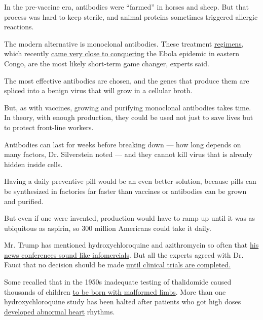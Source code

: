 In the pre-vaccine era, antibodies were ``farmed'' in horses and sheep.
But that process was hard to keep sterile, and animal proteins sometimes
triggered allergic reactions.

The modern alternative is monoclonal antibodies. These treatment
\href{https://www.nytimes.com/2019/08/12/health/ebola-outbreak-cure.html}{regimens},
which recently
\href{https://www.aljazeera.com/news/2020/04/relief-ebola-outbreak-drc-declared-200410121800377.html}{came
very close to conquering} the Ebola epidemic in eastern Congo, are the
most likely short-term game changer, experts said.

The most effective antibodies are chosen, and the genes that produce
them are spliced into a benign virus that will grow in a cellular broth.

But, as with vaccines, growing and purifying monoclonal antibodies takes
time. In theory, with enough production, they could be used not just to
save lives but to protect front-line workers.

Antibodies can last for weeks before breaking down --- how long depends
on many factors, Dr. Silverstein noted --- and they cannot kill virus
that is already hidden inside cells.

Having a daily preventive pill would be an even better solution, because
pills can be synthesized in factories far faster than vaccines or
antibodies can be grown and purified.

But even if one were invented, production would have to ramp up until it
was as ubiquitous as aspirin, so 300 million Americans could take it
daily.

Mr. Trump has mentioned hydroxychloroquine and azithromycin so often
that
\href{https://www.nytimes.com/2020/04/04/health/coronavirus-drug-trump-hydroxycholoroquine.html}{his
news conferences sound like infomercials}. But all the experts agreed
with Dr. Fauci that no decision should be made
\href{https://www.nytimes.com/2020/04/17/health/trump-hydroxychloroquine-coronavirus.html}{until
clinical trials are completed.}

Some recalled that in the 1950s inadequate testing of thalidomide caused
thousands of children
\href{http://broughttolife.sciencemuseum.org.uk/broughttolife/themes/controversies/thalidomide}{to
be born with malformed limbs}. More than one hydroxychloroquine study
has been halted after patients who got high doses
\href{https://www.nytimes.com/2020/04/12/health/chloroquine-coronavirus-trump.html}{developed
abnormal heart} rhythms.

